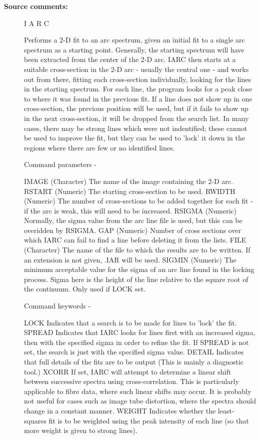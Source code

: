 \begin{description}
\begin{description}
\item [\textbf{Source comments:}]
\begin{terminalv}
 I A R C

 Performs a 2-D fit to an arc spectrum, given an initial fit
 to a single arc spectrum as a starting point.  Generally, the
 starting spectrum will have been extracted from the center of the
 2-D arc.  IARC then starts at a suitable cross-section in the
 2-D arc - usually the central one - and works out from there,
 fitting each cross-section individually, looking for the lines in
 the starting spectrum.  For each line, the program looks for a
 peak close to where it was found in the previous fit.  If a line
 does not show up in one cross-section, the previous position will
 be used, but if it fails to show up in the next cross-section, it
 will be dropped from the search list.  In many cases, there may be
 strong lines which were not indentified; these cannot be used to
 improve the fit, but they can be used to 'lock' it down in the
 regions where there are few or no identified lines.

 Command parameters -

 IMAGE     (Character) The name of the image containing the 2-D arc.
 RSTART    (Numeric) The starting cross-section to be used.
 RWIDTH    (Numeric) The number of cross-sections to be added
           together for each fit - if the arc is weak, this will
           need to be increased.
 RSIGMA    (Numeric) Normally, the sigma value from the arc line
           file is used, but this can be overidden by RSIGMA.
 GAP       (Numeric) Number of cross sections over which IARC can
           fail to find a line before deleting it from the lists.
 FILE      (Character) The name of the file to which the results
           are to be written.  If an extension is not given, .IAR
           will be used.
 SIGMIN    (Numeric) The minimum acceptable value for the sigma of
           an arc line found in the locking process.  Sigma here is
           the height of the line relative to the square root of the
           continuum.  Only used if LOCK set.

 Command keywords -

 LOCK      Indicates that a search is to be made for lines to
           'lock' the fit.
 SPREAD    Indicates that IARC looks for lines first with an
           increased sigma, then with the specified sigma in order
           to refine the fit.  If SPREAD is not set, the search
           is just with the specified sigma value.
 DETAIL    Indicates that full details of the fits are to be output
           (This is mainly a diagnostic tool.)
 XCORR     If set, IARC will attempt to determine a linear shift
           between successive spectra using cross-correlation. This
           is particularly applicable to fibre data, where such linear
           shifts may occur. It is probably not useful for cases such
           as image tube distortion, where the spectra should change
           in a constant manner.
 WEIGHT    Indicates whether the least-squares fit is to be weighted
           using the peak intensity of each line (so that more weight
           is given to strong lines).


\end{terminalv}
\end{description}
\end{description}
